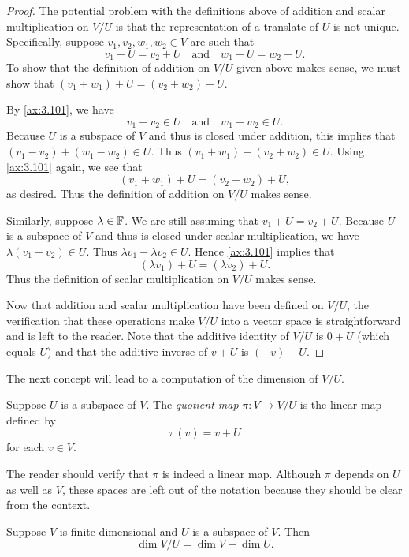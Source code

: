 \begin{proof}
The potential problem with the definitions above of addition and scalar
multiplication on $V/U$ is that the representation of a translate of $U$ is not
unique. Specifically, suppose $v_1,v_2,w_1,w_2\in V$ are such that
\[ v_1+U=v_2+U \quad\text{and}\quad w_1+U=w_2+U. \]
To show that the definition of addition on $V/U$ given above makes sense, we
must show that $(v_1+w_1)+U=(v_2+w_2)+U$.

By \ref{ax:3.101}, we have
\[ v_1-v_2\in U \quad\text{and}\quad w_1-w_2\in U. \]
Because $U$ is a subspace of $V$ and thus is closed under addition, this implies
that $(v_1-v_2)+(w_1-w_2)\in U$. Thus $(v_1+w_1)-(v_2+w_2)\in U$. Using
\ref{ax:3.101} again, we see that
\[ (v_1+w_1)+U = (v_2+w_2)+U, \]
as desired. Thus the definition of addition on $V/U$ makes sense.

Similarly, suppose $\lambda\in\mathbb{F}$. We are still assuming that $v_1+U=v_2+U$.
Because $U$ is a subspace of $V$ and thus is closed under scalar multiplication,
we have $\lambda(v_1-v_2)\in U$. Thus $\lambda v_1-\lambda v_2\in U$. Hence
\ref{ax:3.101} implies that
\[ (\lambda v_1)+U = (\lambda v_2)+U. \]
Thus the definition of scalar multiplication on $V/U$ makes sense.

Now that addition and scalar multiplication have been defined on $V/U$, the
verification that these operations make $V/U$ into a vector space is
straightforward and is left to the reader. Note that the additive identity of
$V/U$ is $0+U$ (which equals $U$) and that the additive inverse of $v+U$ is
$(-v)+U$.
\end{proof}

The next concept will lead to a computation of the dimension of $V/U$.

\begin{definition}\label{ax:3.104}
Suppose $U$ is a subspace of $V$. The \emph{quotient map} $\pi\colon V\to V/U$
is the linear map defined by
\[ \pi(v) = v+U \]
for each $v\in V$.
\end{definition}

The reader should verify that $\pi$ is indeed a linear map. Although $\pi$
depends on $U$ as well as $V$, these spaces are left out of the notation because
they should be clear from the context.

\begin{result}\label{ax:3.105}
Suppose $V$ is finite-dimensional and $U$ is a subspace of $V$. Then
\[ \dim V/U = \dim V-\dim U. \]
\end{result}

